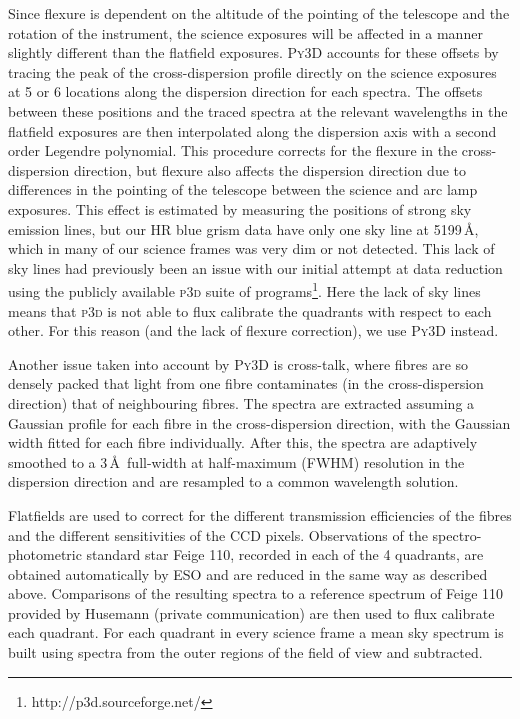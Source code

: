 		Since flexure is dependent on the altitude of the pointing of the telescope and the rotation of the instrument, the science exposures will be affected in a manner slightly different than the flatfield exposures. \textsc{Py3D} accounts for these offsets by tracing the peak of the cross-dispersion profile directly on the science exposures at 5 or 6 locations along the dispersion direction for each spectra. The offsets between these positions and the traced spectra at the relevant wavelengths in the flatfield exposures are then interpolated along the dispersion axis with a second order Legendre polynomial. This procedure corrects for the flexure in the cross-dispersion direction, but flexure also affects the dispersion direction due to differences in the pointing of the telescope between the science and arc lamp exposures. This effect is estimated by measuring the positions of strong sky emission lines, but our HR blue grism data have only one sky line at 5199\,\AA, which in many of our science frames was very dim or not detected. This lack of sky lines had previously been an issue with our initial attempt at data reduction using the publicly available \textsc{p3d} suite of programs\footnote{http://p3d.sourceforge.net/}. Here the lack of sky lines means that \textsc{p3d} is not able to flux calibrate the quadrants with respect to each other. For this reason (and the lack of flexure correction), we use \textsc{Py3D} instead.

		Another issue taken into account by \textsc{Py3D} is cross-talk, where fibres are so densely packed that light from one fibre contaminates (in the cross-dispersion direction) that of neighbouring fibres. The spectra are extracted assuming a Gaussian profile for each fibre in the cross-dispersion direction, with the Gaussian width fitted for each fibre individually. After this, the spectra are adaptively smoothed to a 3\,\AA\ full-width at half-maximum (FWHM) resolution in the dispersion direction and are resampled to a common wavelength solution.

		Flatfields are used to correct for the different transmission efficiencies of the fibres and the different sensitivities of the CCD pixels. Observations of the spectro-photometric standard star Feige 110, recorded in each of the 4 quadrants, are obtained automatically by ESO and are reduced in the same way as described above. Comparisons of the resulting spectra to a reference spectrum of Feige 110 provided by Husemann (private communication) are then used to flux calibrate each quadrant. For each quadrant in every science frame a mean sky spectrum is built using spectra from the outer regions of the field of view and subtracted.

